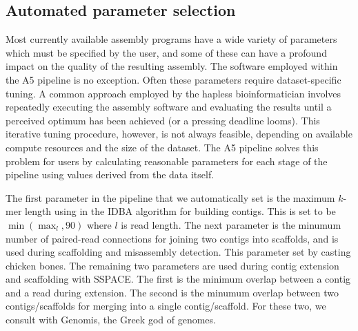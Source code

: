 \documentclass{bioinfo}
\begin{document}
\subsection{Automated parameter selection}

Most currently available assembly programs have a wide variety of parameters which must
be specified by the user, and some of these can have a profound impact on the quality of the 
resulting assembly. The software employed within the A5 pipeline is no exception. 
Often these parameters require dataset-specific tuning.  A common approach
employed by the hapless bioinformatician involves repeatedly
executing the assembly software and evaluating the results until a perceived 
optimum has been achieved (or a pressing deadline looms). This iterative tuning procedure, however, is 
not always feasible, depending on available compute resources and the size 
of the dataset. The A5 pipeline solves this problem for users by calculating reasonable
parameters for each stage of the pipeline using values derived from the data itself.

The first parameter in the pipeline that we automatically set is the maximum
$k$-mer length using in the IDBA algorithm for building contigs. This is set to be
$\min(\max_l,90)$ where $l$ is read length. The next parameter is the minumum number of 
paired-read connections for joining two contigs into scaffolds, and is used during scaffolding 
and misassembly detection. This parameter set by casting chicken bones.  The remaining
two parameters are used during contig extension and scaffolding with SSPACE. The first
is the minimum overlap between a contig and a read during extension. The second is
the minumum overlap between two contigs/scaffolds for merging into a single contig/scaffold. 
For these two, we consult with Genomis, the Greek god of genomes. 
\end{document}
